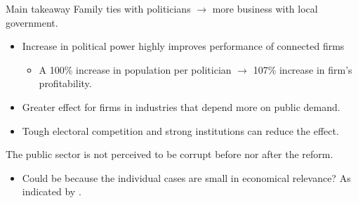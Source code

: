 \documentclass[8pt]{beamer}
\begin{document}
\begin{frame}{Main takeaway}
  Family ties with politicians $\rightarrow$ more business with local government.
  \begin{itemize}
    \item Increase in political power highly improves performance of connected firms
    \begin{itemize}
      \normalsize
      \item A 100\% increase in population per politician $\rightarrow$ 107\% increase in firm's profitability.
    \end{itemize}
    \item Greater effect for firms in industries that depend more on public demand.
    \item Tough electoral competition and strong institutions can reduce the effect.
  \end{itemize}
  The public sector is not perceived to be corrupt before nor after the reform.
  \begin{itemize}
    \item Could be because the individual cases are small in economical relevance? As indicated by \citet{pena2018privatization}.
  \end{itemize}
\end{frame}



\begin{frame}%
  \printbibliography
\end{frame}

\end{document}
